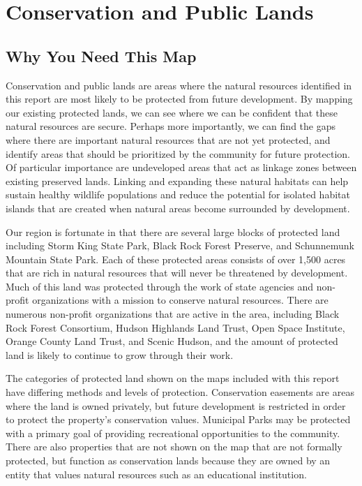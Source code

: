 \label{map:farmlandsoilsandagparcels}
\section{Conservation and Public Lands}\label{subsec:conservation}
\subsection*{Why You Need This Map}
Conservation and public lands are areas where the natural resources identified 
in this report are most likely to be protected from future development. By 
mapping our existing protected lands, we can see where we can be confident that 
these natural resources are secure. Perhaps more importantly, we can find the 
gaps where there are important natural resources that are not yet protected, 
and identify areas that should be prioritized by the community for future 
protection. Of particular importance are undeveloped areas that act as linkage 
zones between existing preserved lands. Linking and expanding these natural 
habitats can help sustain healthy wildlife populations and reduce the potential 
for isolated habitat islands that are created when natural areas become 
surrounded by development. 
\par
Our region is fortunate in that there are several large blocks of protected 
land including Storm King State Park, Black Rock Forest Preserve, and 
Schunnemunk Mountain State Park. Each of these protected areas consists of over 
1,500 acres that are rich in natural resources that will never be threatened by 
development. Much of this land was protected through the work of state agencies 
and non-profit organizations with a mission to conserve natural resources. There 
are numerous non-profit organizations that are active in the area, including 
Black Rock Forest Consortium, Hudson Highlands Land Trust, Open Space 
Institute, Orange County Land Trust, and Scenic Hudson, and the amount of 
protected land is likely to continue to grow through their work. 
\par
The categories of protected land shown on the maps included with this report 
have differing methods and levels of protection. Conservation easements are 
areas where the land is owned privately, but future development is restricted in 
order to protect the property’s conservation values. Municipal Parks may be 
protected with a primary goal of providing recreational opportunities to the 
community. There are also properties that are not shown on the map that are not 
formally protected, but function as conservation lands because they are owned by 
an entity that values natural resources such as an educational institution. 

